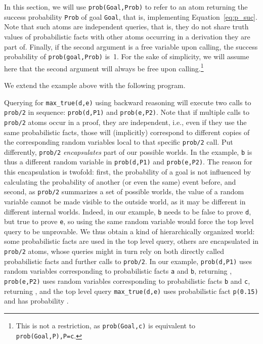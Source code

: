 \documentclass[a4paper]{article}
\begin{document}
In this section, we will use \verb|prob(Goal,Prob)| to refer to an atom returning the success probability \verb|Prob| of goal \verb|Goal|, that is, implementing Equation~\eqref{eq:p_suc}. Note that such atoms are independent queries, that is, they do not share truth values of probabilistic facts with other atoms occurring in a derivation they are part of. Finally, if the second argument is a free variable upon calling, the success probability of \verb|prob(goal,Prob)| is~1. For the sake of simplicity, we will assume here that the second argument will always be free upon calling.\footnote{This is not a restriction, as \texttt{prob(Goal,c)} is equivalent to \texttt{prob(Goal,P),P=c}.}

We extend the example above with the following program.

Querying for \verb|max_true(d,e)| using backward reasoning will execute two  calls to \verb|prob/2| in sequence: \verb|prob(d,P1)| and \verb|prob(e,P2)|.  
Note that if multiple calls to  \verb|prob/2|  atoms occur in a proof,
they are independent, i.e., even if they use the same probabilistic facts, those will (implicitly) correspond to different copies of the corresponding random variables local to that specific \verb|prob/2| call. Put differently, \verb|prob/2| \emph{encapsulates} part of our possible worlds. In the example, \verb|b| is thus a different random variable in \verb|prob(d,P1)| and \verb|prob(e,P2)|. 
The reason for this encapsulation is twofold: first, the probability of a goal is not influenced by calculating the probability of another (or even the same) event before, and second, as \verb|prob/2| summarizes a set of possible worlds, the value of a random variable cannot be made visible to the outside world, as it may be different in different internal worlds. Indeed, in our example, \verb|b| needs to be false to prove \verb|d|, but true to prove \verb|e|, so using the same random variable would force the top level query to be unprovable. 
We thus obtain a kind of hierarchically organized world: some probabilistic facts are used in the top level query, others are encapsulated in \verb|prob/2| atoms, whose queries might in turn rely on both directly called probabilistic facts and further calls to \verb|prob/2|.  In our example, \verb|prob(d,P1)| uses random variables corresponding to probabilistic facts \verb|a| and \verb|b|, returning ,  \verb|prob(e,P2)| uses random variables corresponding to probabilistic facts \verb|b| and \verb|c|, returning , and  the top level query \verb|max_true(d,e)| uses probabilistic fact \verb|p(0.15)| and has probability .
\end{document}

